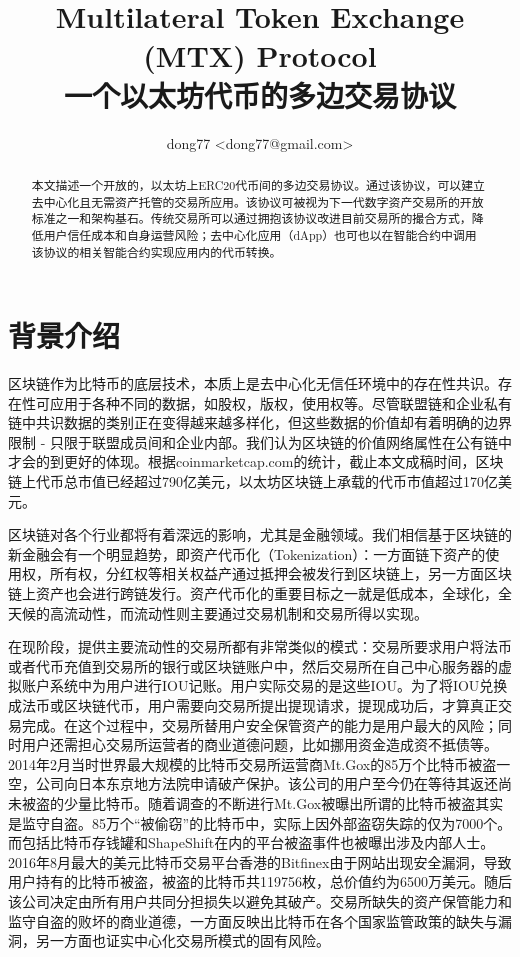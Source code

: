 \documentclass[UTF8,nofonts]{ctexart}
\title{Multilateral Token Exchange (MTX) Protocol\\一个以太坊代币的多边交易协议}
\author{ 
    dong77 <dong77@gmail.com>
}
\begin{document}
\maketitle

\begin{abstract}
本文描述一个开放的，以太坊上ERC20代币间的多边交易协议。通过该协议，可以建立去中心化且无需资产托管的交易所应用。该协议可被视为下一代数字资产交易所的开放标准之一和架构基石。传统交易所可以通过拥抱该协议改进目前交易所的撮合方式，降低用户信任成本和自身运营风险；去中心化应用（dApp）也可也以在智能合约中调用该协议的相关智能合约实现应用内的代币转换。

\end{abstract}

\section{背景介绍\label{sec:background}}

区块链作为比特币的底层技术，本质上是去中心化无信任环境中的存在性共识。存在性可应用于各种不同的数据，如股权，版权，使用权等。尽管联盟链和企业私有链中共识数据的类别正在变得越来越多样化，但这些数据的价值却有着明确的边界限制 - 只限于联盟成员间和企业内部。我们认为区块链的价值网络属性在公有链中才会的到更好的体现。根据coinmarketcap.com的统计，截止本文成稿时间，区块链上代币总市值已经超过790亿美元，以太坊区块链上承载的代币市值超过170亿美元。

区块链对各个行业都将有着深远的影响，尤其是金融领域。我们相信基于区块链的新金融会有一个明显趋势，即资产代币化（Tokenization）：一方面链下资产的使用权，所有权，分红权等相关权益产通过抵押会被发行到区块链上，另一方面区块链上资产也会进行跨链发行。资产代币化的重要目标之一就是低成本，全球化，全天候的高流动性，而流动性则主要通过交易机制和交易所得以实现。

在现阶段，提供主要流动性的交易所都有非常类似的模式：交易所要求用户将法币或者代币充值到交易所的银行或区块链账户中，然后交易所在自己中心服务器的虚拟账户系统中为用户进行IOU记账。用户实际交易的是这些IOU。为了将IOU兑换成法币或区块链代币，用户需要向交易所提出提现请求，提现成功后，才算真正交易完成。在这个过程中，交易所替用户安全保管资产的能力是用户最大的风险；同时用户还需担心交易所运营者的商业道德问题，比如挪用资金造成资不抵债等。2014年2月当时世界最大规模的比特币交易所运营商Mt.Gox的85万个比特币被盗一空，公司向日本东京地方法院申请破产保护。该公司的用户至今仍在等待其返还尚未被盗的少量比特币。随着调查的不断进行Mt.Gox被曝出所谓的比特币被盗其实是监守自盗。85万个“被偷窃”的比特币中，实际上因外部盗窃失踪的仅为7000个。而包括比特币存钱罐和ShapeShift在内的平台被盗事件也被曝出涉及内部人士。2016年8月最大的美元比特币交易平台香港的Bitfinex由于网站出现安全漏洞，导致用户持有的比特币被盗，被盗的比特币共119756枚，总价值约为6500万美元。随后该公司决定由所有用户共同分担损失以避免其破产。交易所缺失的资产保管能力和监守自盗的败坏的商业道德，一方面反映出比特币在各个国家监管政策的缺失与漏洞，另一方面也证实中心化交易所模式的固有风险。
\end{document}
